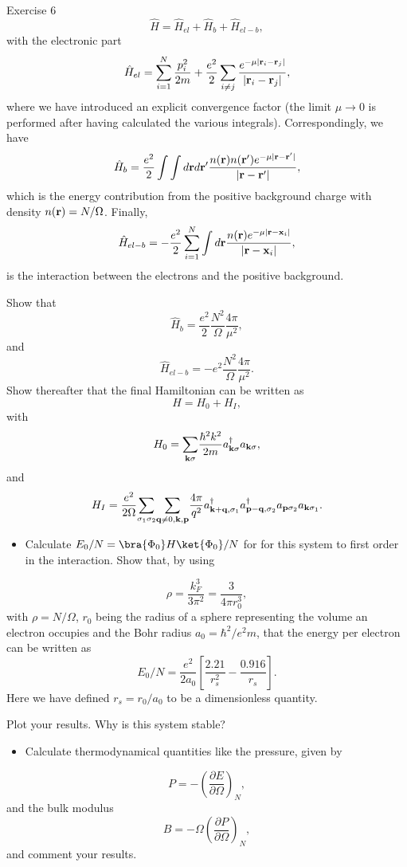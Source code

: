 \documentclass[%
twoside,                 %
final,                   %
10pt]{article}
\begin{document}
\begin{block}{Exercise 6 }
\noindent
\[
\hat{H}=\hat{H}_{el}+\hat{H}_{b}+\hat{H}_{el-b},
\]
with the electronic part
\[
\hat{H}_{el}=\sum_{i=1}^N\frac{p_i^2}{2m}+\frac{e^2}{2}\sum_{i\ne j}\frac{e^{-\mu |{\bf r}_i-{\bf r}_j|}}{|{\bf r}_i-{\bf r}_j|},
\]
where we have introduced an explicit convergence factor
(the limit $\mu\rightarrow 0$ is performed after having calculated the various integrals).
Correspondingly, we have
\[
\hat{H}_{b}=\frac{e^2}{2}\int\int d{\bf r}d{\bf r}'\frac{n({\bf r})n({\bf r}')e^{-\mu |{\bf r}-{\bf r}'|}}{|{\bf r}-{\bf r}'|},
\]
which is the energy contribution from the positive background charge with density
$n({\bf r})=N/\Omega$. Finally,
\[
\hat{H}_{el-b}=-\frac{e^2}{2}\sum_{i=1}^N\int d{\bf r}\frac{n({\bf r})e^{-\mu |{\bf r}-{\bf x}_i|}}{|{\bf r}-{\bf x}_i|},
\]
is the interaction between the electrons and the positive background.

Show that
\[
\hat{H}_{b}=\frac{e^2}{2}\frac{N^2}{\Omega}\frac{4\pi}{\mu^2},
\]
and
\[
\hat{H}_{el-b}=-e^2\frac{N^2}{\Omega}\frac{4\pi}{\mu^2}.
\]
Show thereafter that the final Hamiltonian can be written as 
\[
H=H_{0}+H_{I},
\]
with
\[
H_{0}={\displaystyle\sum_{{\bf k}\sigma}}
\frac{\hbar^{2}k^{2}}{2m}a_{{\bf k}\sigma}^{\dagger}
a_{{\bf k}\sigma},
\]
and
\[
H_{I}=\frac{e^{2}}{2\Omega}{\displaystyle\sum_{\sigma_{1}
\sigma_{2}}}{\displaystyle
\sum_{{\bf q}\neq 0,{\bf k},{\bf p}}}\frac{4\pi}{q^{2}}
a_{{\bf k}+{\bf q},\sigma_{1}}^{\dagger}
a_{{\bf p}-{\bf q},\sigma_{2}}^{\dagger}
a_{{\bf p}\sigma_{2}}a_{{\bf k}\sigma_{1}}.
\] 
\begin{itemize}
 \item Calculate $E_0/N=\bra{\Phi_{0}}H\ket{\Phi_{0}}/N$ for for this system to first order in the interaction. Show that, by using
\end{itemize}

\noindent
\[
\rho= \frac{k_F^3}{3\pi^2}=\frac{3}{4\pi r_0^3},
\]
with $\rho=N/\Omega$, $r_0$
being the radius of a sphere representing the volume an electron occupies 
and the Bohr radius $a_0=\hbar^2/e^2m$, 
that the energy per electron can be written as 
\[
E_0/N=\frac{e^2}{2a_0}\left[\frac{2.21}{r_s^2}-\frac{0.916}{r_s}\right].
\]
Here we have defined
$r_s=r_0/a_0$ to be a dimensionless quantity.

Plot your results. Why is this system stable?
\begin{itemize}
 \item Calculate thermodynamical quantities like the pressure, given by
\end{itemize}

\noindent
\[
P=-\left(\frac{\partial E}{\partial \Omega}\right)_N,
\]
and the bulk modulus
\[
B=-\Omega\left(\frac{\partial P}{\partial \Omega}\right)_N,
\]
and comment your results.

\end{block}
\end{document}
